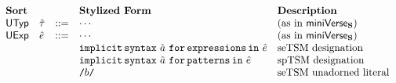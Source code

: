 \begin{figure}
\[\begin{array}{lllllll}
\textbf{Sort} & & 
& \textbf{Stylized Form} & \textbf{Description}\\
\mathsf{UTyp} & {\hat\tau} & ::= 
& \cdots & \text{(as in $\mathsf{miniVerse}_\textbf{S}$)}\\
\mathsf{UExp} & {\hat e} & ::= 
& \cdots & \text{(as in $\mathsf{miniVerse}_\textbf{S}$)}\\
&&& \texttt{implicit\,syntax}~\hat{a}~\texttt{for\,expressions\,in}~{\hat e} & \text{seTSM designation}\\
&&& \texttt{implicit\,syntax}~\hat{a}~\texttt{for\,patterns\,in}~{\hat e} & \text{spTSM designation}\\
&&& {\texttt{/}b\texttt{/}} & \text{seTSM unadorned literal}\\

\end{array}\]
\end{figure}
